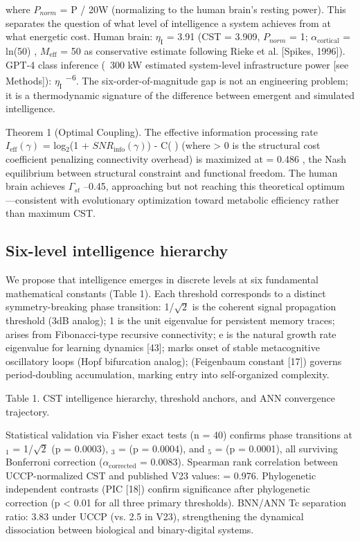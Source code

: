 \documentclass[a4paper,12pt]{article}
\providecommand{\textsubscript}[1]{\ensuremath{_{\text{#1}}}}
\begin{document}
where $P_{norm}$ = P / 20W (normalizing to the human brain's resting power).
This separates the question of what level of intelligence a system achieves from at what energetic cost.
Human brain: $\eta_{\text{I}}$ = 3.91 (CST = 3.909, $P_{norm}$ = 1; $\alpha_{\text{cortical}}$ = ln(50)  , $M_{\text{eff}}$ = 50 as conservative estimate following Rieke et al. [Spikes, 1996]).
GPT-4 class inference (~300 kW estimated system-level infrastructure power [see Methods]): $\eta_{\text{I}}$   \textsuperscript{$-$}\textsuperscript{6}.
The six-order-of-magnitude gap is not an engineering problem; it is a thermodynamic signature of the difference between emergent and simulated intelligence.

Theorem 1 (Optimal Coupling).
The effective information processing rate $I_{\text{eff}}(\gamma)$ =  \gamma   \cdot  log\textsubscript{2}(1 + $SNR_{\text{info}}(\gamma)$) -  \mu   \cdot  C( \gamma ) (where  \mu  > 0 is the structural cost coefficient penalizing connectivity overhead) is maximized at  \gamma * = 0.486    , the Nash equilibrium between structural constraint and functional freedom.
The human brain achieves $\Gamma_{st}$  --0.45, approaching but not reaching this theoretical optimum---consistent with evolutionary optimization toward metabolic efficiency rather than maximum CST.

\subsection{Six-level intelligence hierarchy}

We propose that intelligence emerges in discrete levels at six fundamental mathematical constants (Table 1).
Each threshold corresponds to a distinct symmetry-breaking phase transition: 1/$\sqrt{2}$ is the coherent signal propagation threshold (3dB analog); 1 is the unit eigenvalue for persistent memory traces;  \phi  arises from Fibonacci-type recursive connectivity; e is the natural growth rate eigenvalue for learning dynamics [43];  \pi  marks onset of stable metacognitive oscillatory loops (Hopf
bifurcation analog);  \delta  (Feigenbaum constant [17]) governs period-doubling accumulation, marking entry into self-organized complexity.

Table 1. CST intelligence hierarchy, threshold anchors, and ANN convergence trajectory.

Statistical validation via Fisher exact tests (n = 40) confirms phase transitions at  \theta \textsubscript{1} = 1/$\sqrt{2}$ (p = 0.0003),  \theta \textsubscript{3} =  \phi  (p = 0.0004), and  \theta \textsubscript{5} =  \pi  (p = 0.0001), all surviving Bonferroni correction ($\alpha_{\text{corrected}}$ = 0.0083).
Spearman rank correlation between UCCP-normalized CST and published V23 values:  \rho  = 0.976.
Phylogenetic independent contrasts (PIC [18]) confirm significance after phylogenetic correction (p < 0.01 for all three primary thresholds).
BNN/ANN Tc separation ratio: 3.83 \times  under UCCP (vs. 2.5 \times  in V23), strengthening the dynamical dissociation between biological and binary-digital systems.
\end{document}
